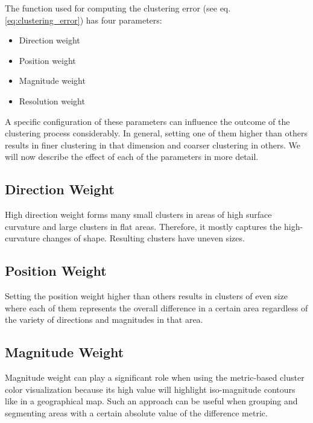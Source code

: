 The function used for computing the clustering error (see eq. \ref{eq:clustering_error}) has four parameters:

\begin{itemize}
\item Direction weight
\item Position weight
\item Magnitude weight
\item Resolution weight
\end{itemize}

A specific configuration of these parameters can influence the outcome of the clustering process considerably. In general, setting one of them higher than others results in finer clustering in that dimension and coarser clustering in others. We will now describe the effect of each of the parameters in more detail.

\subsection{Direction Weight}

High direction weight forms many small clusters in areas of high surface curvature and large clusters in flat areas. Therefore, it mostly captures the high-curvature changes of shape. Resulting clusters have uneven sizes.
\subsection{Position Weight}

Setting the position weight higher than others results in clusters of even size where each of them represents the overall difference in a certain area regardless of the variety of directions and magnitudes in that area.
\subsection{Magnitude Weight}

Magnitude weight can play a significant role when using the metric-based cluster color visualization because its high value will highlight iso-magnitude contours like in a geographical map. Such an approach can be useful when grouping and segmenting areas with a certain absolute value of the difference metric.
